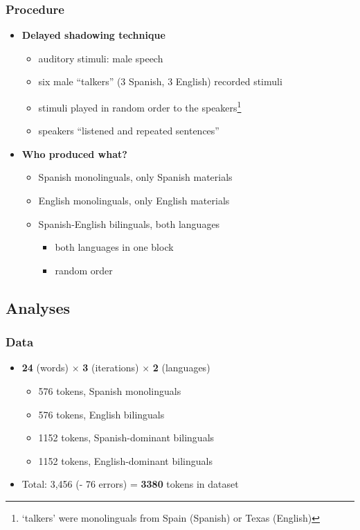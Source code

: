 \documentclass{beamer}
\begin{document}
\begin{frame}
\frametitle{Procedure}
\begin{itemize}
	\item \textbf{Delayed shadowing technique}
	\begin{itemize}
		\item auditory stimuli: male speech
		\item six male ``talkers'' (3 Spanish, 3 English) recorded stimuli
		\item stimuli played in random order to the speakers\footnote{`talkers' were monolinguals from Spain (Spanish) or Texas (English)}
		\item speakers ``listened and repeated sentences''
	\end{itemize}
	\item \textbf{Who produced what?}
	\begin{itemize}
		\item Spanish monolinguals, only Spanish materials
		\item English monolinguals, only English materials
		\item Spanish-English bilinguals, both languages
		\begin{itemize}
			\item both languages in one block
			\item random order
		\end{itemize}
	\end{itemize}
\end{itemize}
\end{frame}

\subsection{Analyses}

\begin{frame}
\frametitle{Data}
\begin{itemize}
	\item \textbf{24} (words) $\times$ \textbf{3} (iterations) $\times$ \textbf{2} (languages)
	\begin{itemize}
		\item 576 tokens, Spanish monolinguals
		\item 576 tokens, English bilinguals
		\item 1152 tokens, Spanish-dominant bilinguals
		\item 1152 tokens, English-dominant bilinguals
	\end{itemize}
	\item Total: 3,456 (- 76 errors) = \textbf{3380} tokens in dataset
\end{itemize}
\end{frame}
\end{document}
